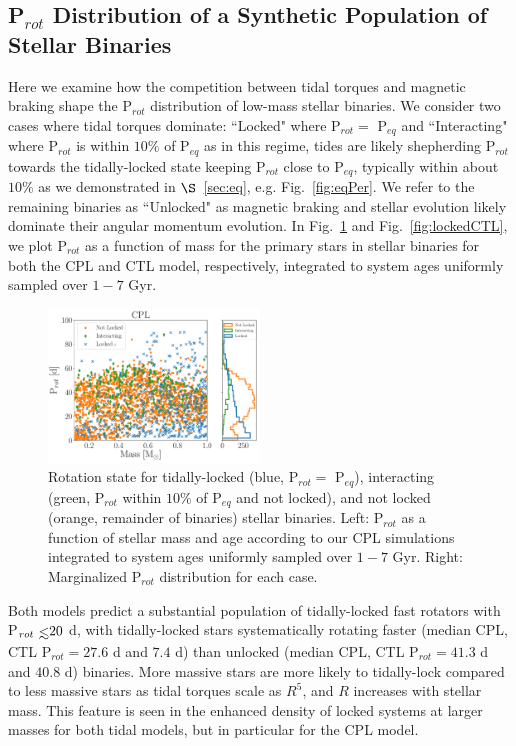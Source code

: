 \documentclass[twocolumn]{aastex61}
\def\lsim{~\rlap{$<$}{\lower 1.0ex\hbox{$\sim$}}}
\begin{document}
\subsection{P$_{rot}$ Distribution of a Synthetic Population of Stellar Binaries} \label{sec:protDist}

Here we examine how the competition between tidal torques and magnetic braking shape the P$_{rot}$ distribution of low-mass stellar binaries.  We consider two cases where tidal torques dominate: ``Locked" where P$_{rot} = $ P$_{eq}$ and ``Interacting" where P$_{rot}$ is within $10\%$ of P$_{eq}$ as in this regime, tides are likely shepherding P$_{rot}$ towards the tidally-locked state keeping P$_{rot}$ close to P$_{eq}$, typically within about $10\%$ as we demonstrated in $\S$~\ref{sec:eq}, e.g. Fig.~\ref{fig:eqPer}. We refer to the remaining binaries as ``Unlocked" as magnetic braking and stellar evolution likely dominate their angular momentum evolution.  In Fig.~\ref{fig:lockedCPL} and Fig.~\ref{fig:lockedCTL}, we plot P$_{rot}$ as a function of mass for the primary stars in stellar binaries for both the CPL and CTL model, respectively, integrated to system ages uniformly sampled over $1-7$ Gyr.  

\begin{figure}
	\includegraphics[width=0.5\textwidth]{../Plots/lockedCPL.pdf}
   \caption{Rotation state for tidally-locked (blue, P$_{rot} = $ P$_{eq}$), interacting (green, P$_{rot}$ within $10\%$ of P$_{eq}$ and not locked), and not locked (orange, remainder of binaries) stellar binaries. Left: P$_{rot}$ as a function of stellar mass and age according to our CPL simulations integrated to system ages uniformly sampled over $1-7$ Gyr. Right: Marginalized P$_{rot}$ distribution for each case.}%
    \label{fig:lockedCPL}%
\end{figure}

Both models predict a substantial population of tidally-locked fast rotators with P$_{rot} \lsim 20$ d, with tidally-locked stars systematically rotating faster (median CPL, CTL P$_{rot} = 27.6$ d and $7.4$ d) than unlocked (median CPL, CTL P$_{rot} = 41.3$ d and $40.8$ d) binaries. More massive stars are more likely to tidally-lock compared to less massive stars as tidal torques scale as $R^5$, and $R$ increases with stellar mass.  This feature is seen in the enhanced density of locked systems at larger masses for both tidal models, but in particular for the CPL model.
\end{document}
